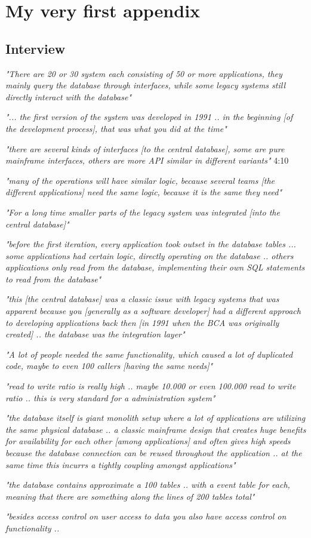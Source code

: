 \chapter{My very first appendix}
\label{app:myveryfirstappendix}


\section{Interview}


\textit{"There are 20 or 30 system each consisting of 50 or more applications, they mainly query the database through interfaces, while some legacy systems still directly interact with the database"}

\textit{"... the first version of the system was developed in 1991 .. in the beginning [of the development process], that was what you did at the time"}

\textit{"there are several kinds of interfaces [to the central database], some are pure mainframe interfaces, others are more API similar in different variants"} 4:10

\textit{"many of the operations will have similar logic, because several teams [the different applications] need the same logic, because it is the same they need"}

\textit{"For a long time smaller parts of the legacy system was integrated [into the central database]"}

\textit{"before the first iteration, every application took outset in the database tables ... some applications had certain logic, directly operating on the database .. others applications only read from the database, implementing their own SQL statements to read from the database"}

\textit{"this [the central database] was a classic issue with legacy systems that was apparent because you [generally as a software developer] had a different approach to developing applications back then [in 1991 when the BCA was originally created] .. the database was the integration layer"}

\textit{"A lot of people needed the same functionality, which caused a lot of duplicated code, maybe to even 100 callers [having the same needs]"}

\textit{"read to write ratio is really high .. maybe 10.000 or even 100.000 read to write ratio .. this is very standard for a administration system"}

\textit{"the database itself is giant monolith setup where a lot of applications are utilizing the same physical database .. a classic mainframe design that creates huge benefits for availability for each other [among applications] and often gives high speeds because the database connection can be reused throughout the application .. at the same time this incurrs a tightly coupling amongst applications"}

\textit{"the database contains approximate a 100 tables .. with a event table for each, meaning that there are something along the lines of 200 tables total"}

\textit{"besides access control on user access to data you also have access control on functionality .. }
